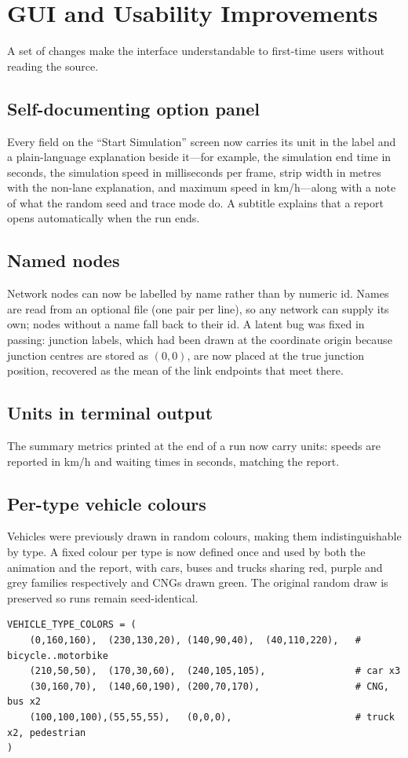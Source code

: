 \documentclass[11pt,a4paper]{article}
\newcommand{\code}[1]{\texttt{\detokenize{#1}}}
\begin{document}
\section{GUI and Usability Improvements}
\label{sec:gui}
A set of changes make the interface understandable to first-time users without
reading the source.

\subsection{Self-documenting option panel}
Every field on the ``Start Simulation'' screen now carries its unit in the label
and a plain-language explanation beside it---for example, the simulation end time
in seconds, the simulation speed in milliseconds per frame, strip width in metres
with the non-lane explanation, and maximum speed in km/h---along with a note of
what the random seed and trace mode do. A subtitle explains that a report opens
automatically when the run ends.

\subsection{Named nodes}
Network nodes can now be labelled by name rather than by numeric id. Names are read
from an optional \code{input/node_names.txt} file (one \code{id name} pair per
line), so any network can supply its own; nodes without a name fall back to their
id. A latent bug was fixed in passing: junction labels, which had been drawn at the
coordinate origin because junction centres are stored as $(0,0)$, are now placed at
the true junction position, recovered as the mean of the link endpoints that meet
there.

\subsection{Units in terminal output}
The summary metrics printed at the end of a run now carry units: speeds are
reported in km/h and waiting times in seconds, matching the report.

\subsection{Per-type vehicle colours}
Vehicles were previously drawn in random colours, making them indistinguishable by
type. A fixed colour per type is now defined once and used by both the animation
and the report, with cars, buses and trucks sharing red, purple and grey families
respectively and CNGs drawn green. The original random draw is preserved so runs
remain seed-identical.
\begin{lstlisting}
VEHICLE_TYPE_COLORS = (
    (0,160,160),  (230,130,20), (140,90,40),  (40,110,220),   # bicycle..motorbike
    (210,50,50),  (170,30,60),  (240,105,105),                # car x3
    (30,160,70),  (140,60,190), (200,70,170),                 # CNG, bus x2
    (100,100,100),(55,55,55),   (0,0,0),                      # truck x2, pedestrian
)
\end{lstlisting}
\end{document}
